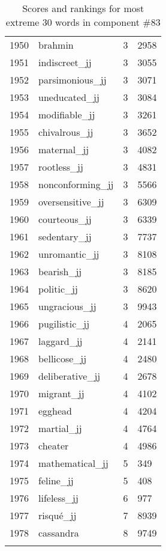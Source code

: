 \begin{longtable}[!htbp]{| rlr@{.}l |}
    1950 & brahmin & 3 & 2958 \\
    1951 & indiscreet\_jj & 3 & 3055 \\
    1952 & parsimonious\_jj & 3 & 3071 \\
    1953 & uneducated\_jj & 3 & 3084 \\
    1954 & modifiable\_jj & 3 & 3261 \\
    1955 & chivalrous\_jj & 3 & 3652 \\
    1956 & maternal\_jj & 3 & 4082 \\
    1957 & rootless\_jj & 3 & 4831 \\
    1958 & nonconforming\_jj & 3 & 5566 \\
    1959 & oversensitive\_jj & 3 & 6309 \\
    1960 & courteous\_jj & 3 & 6339 \\
    1961 & sedentary\_jj & 3 & 7737 \\
    1962 & unromantic\_jj & 3 & 8108 \\
    1963 & bearish\_jj & 3 & 8185 \\
    1964 & politic\_jj & 3 & 8620 \\
    1965 & ungracious\_jj & 3 & 9943 \\
    1966 & pugilistic\_jj & 4 & 2065 \\
    1967 & laggard\_jj & 4 & 2141 \\
    1968 & bellicose\_jj & 4 & 2480 \\
    1969 & deliberative\_jj & 4 & 2678 \\
    1970 & migrant\_jj & 4 & 4102 \\
    1971 & egghead & 4 & 4204 \\
    1972 & martial\_jj & 4 & 4764 \\
    1973 & cheater & 4 & 4986 \\
    1974 & mathematical\_jj & 5 & 349 \\
    1975 & feline\_jj & 5 & 408 \\
    1976 & lifeless\_jj & 6 & 977 \\
    1977 & risqué\_jj & 7 & 8939 \\
    1978 & cassandra & 8 & 9749 \\
    \hline
    \caption{Scores and rankings for most extreme 30 words in component \#83} \\
\end{longtable}
